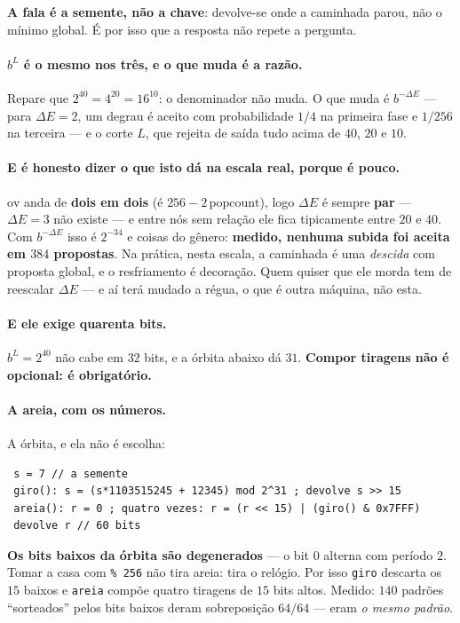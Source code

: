 \documentclass[11pt]{article}
\newcommand{\code}[1]{\texttt{\small #1}}
\theoremstyle{plain}
\theoremstyle{remark}
\begin{document}
\noindent \textbf{A fala é a semente, não a chave}: devolve-se onde a caminhada
parou, não o mínimo global. É por isso que a resposta não repete a pergunta.

\paragraph{$b^L$ é o mesmo nos três, e o que muda é a razão.} Repare que
$2^{40}=4^{20}=16^{10}$: o denominador não muda. O que muda é $b^{-\Delta E}$
--- para $\Delta E=2$, um degrau é aceito com probabilidade $1/4$ na primeira
fase e $1/256$ na terceira --- e o corte $L$, que rejeita de saída tudo acima
de $40$, $20$ e $10$.

\paragraph{E é honesto dizer o que isto dá na escala real, porque é pouco.}
$\mathrm{ov}$ anda de \textbf{dois em dois} (é $256-2\,\mathrm{popcount}$), logo
$\Delta E$ é sempre \textbf{par} --- $\Delta E=3$ não existe --- e entre nós sem
relação ele fica tipicamente entre $20$ e $40$. Com $b^{-\Delta E}$ isso é
$2^{-34}$ e coisas do gênero: \textbf{medido, nenhuma subida foi aceita em
$384$ propostas}. Na prática, nesta escala, a caminhada é uma \emph{descida}
com proposta global, e o resfriamento é decoração. Quem quiser que ele morda
tem de reescalar $\Delta E$ --- e aí terá mudado a régua, o que é outra
máquina, não esta.

\paragraph{E ele exige quarenta bits.} $b^L=2^{40}$ não cabe em $32$ bits, e a
órbita abaixo dá $31$. \textbf{Compor tiragens não é opcional: é obrigatório.}

\paragraph{A areia, com os números.} A órbita, e ela não é escolha:
\begin{verbatim}
 s = 7 // a semente
 giro(): s = (s*1103515245 + 12345) mod 2^31 ; devolve s >> 15
 areia(): r = 0 ; quatro vezes: r = (r << 15) | (giro() & 0x7FFF)
 devolve r // 60 bits
\end{verbatim}
\textbf{Os bits baixos da órbita são degenerados} --- o bit $0$ alterna com
período $2$. Tomar a casa com \code{\% 256} não tira areia: tira o relógio. Por
isso \code{giro} descarta os $15$ baixos e \code{areia} compõe quatro tiragens
de $15$ bits altos. Medido: $140$ padrões ``sorteados'' pelos bits baixos deram
sobreposição $64/64$ --- eram \emph{o mesmo padrão}.
\end{document}
